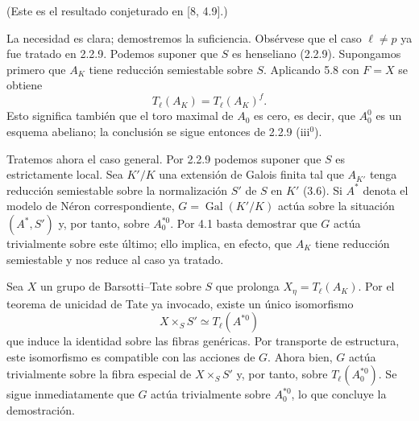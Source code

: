 (Este es el resultado conjeturado en [8, 4.9].)

La necesidad es clara; demostremos la suficiencia. Obsérvese que el caso
$\ell\neq p$ ya fue tratado en 2.2.9. Podemos suponer que $S$ es
henseliano (2.2.9). Supongamos primero que $A_K$ tiene reducción
semiestable sobre $S$. Aplicando 5.8 con $F=X$ se obtiene
\[
 T_\ell(A_K)=T_\ell(A_K)^f.
\]
Esto significa también que el toro maximal de $A_0$ es cero, es decir,
que $A_0^0$ es un esquema abeliano; la conclusión se sigue entonces de
2.2.9 (iii${}^0$).


Tratemos ahora el caso general. Por 2.2.9 podemos suponer que $S$ es
estrictamente local. Sea $K'/K$ una extensión de Galois finita tal que
$A_{K'}$ tenga reducción semiestable sobre la normalización $S'$ de $S$
en $K'$ (3.6). Si $A^*$ denota el modelo de Néron correspondiente,
$G=\operatorname{Gal}(K'/K)$ actúa sobre la situación $(A^*,S')$ y,
por tanto, sobre $A_0^{*0}$. Por 4.1 basta demostrar que $G$ actúa
trivialmente sobre este último; ello implica, en efecto, que $A_K$ tiene
reducción semiestable y nos reduce al caso ya tratado.

Sea $X$ un grupo de Barsotti--Tate sobre $S$ que prolonga
$X_\eta=T_\ell(A_K)$. Por el teorema de unicidad de Tate ya invocado,
existe un único isomorfismo
\[
 X\times_S S'\simeq T_\ell(A^{*0})
\]
que induce la identidad sobre las fibras genéricas. Por transporte de
estructura, este isomorfismo es compatible con las acciones de $G$.
Ahora bien, $G$ actúa trivialmente sobre la fibra especial de
$X\times_S S'$ y, por tanto, sobre $T_\ell(A_0^{*0})$. Se sigue
inmediatamente que $G$ actúa trivialmente sobre $A_0^{*0}$, lo que
concluye la demostración.
